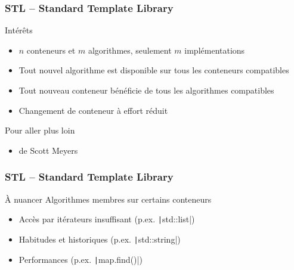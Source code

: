 \documentclass[C++.tex]{subfiles}
\begin{document}
\begin{frame}[fragile]
	\frametitle{STL -- Standard Template Library}
	\begin{block}{Intérêts}
		\begin{itemize}
			\item $n$ conteneurs et $m$ algorithmes, seulement $m$ implémentations
			\item Tout nouvel algorithme est disponible sur tous les conteneurs compatibles
			\item Tout nouveau conteneur bénéficie de tous les algorithmes compatibles
			\item Changement de conteneur à effort réduit
		\end{itemize}
	\end{block}

	\begin{block}{Pour aller plus loin}
		\begin{itemize}
			\item \cite{effStl} de Scott Meyers
		\end{itemize}
	\end{block}
\end{frame}

\begin{frame}[fragile]
	\frametitle{STL -- Standard Template Library}
	\begin{block}{À nuancer}
		Algorithmes membres sur certains conteneurs
		\begin{itemize}
			\item Accès par itérateurs insuffisant (p.ex. \texttt|std::list|)
			\item Habitudes et historiques (p.ex. \texttt|std::string|)
			\item Performances (p.ex. \texttt|map.find()|)
		\end{itemize}
	\end{block}
\end{frame}
\end{document}
